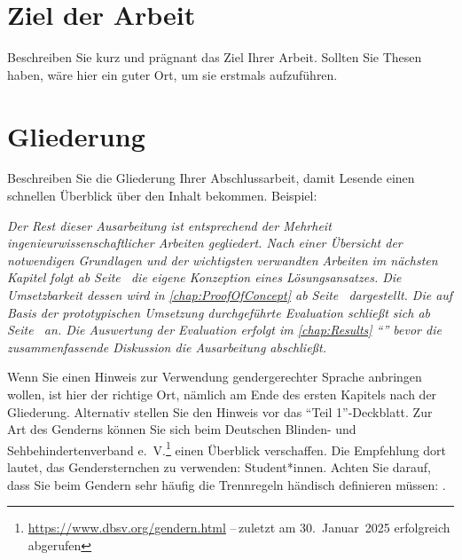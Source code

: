 \section{Ziel der Arbeit}\label{sec:Intro:Goal}
Beschreiben Sie kurz und prägnant das Ziel Ihrer Arbeit. Sollten Sie Thesen haben, wäre hier ein guter Ort, um sie erstmals aufzuführen.


\section{Gliederung}\label{sec:Intro:Structure}
Beschreiben Sie die Gliederung Ihrer Abschlussarbeit, damit Lesende einen schnellen Überblick über den Inhalt bekommen. Beispiel:

\emph{Der Rest dieser Ausarbeitung ist entsprechend der Mehrheit ingenieurwissenschaftlicher Arbeiten gegliedert. Nach einer Übersicht der notwendigen Grundlagen und der wichtigsten verwandten Arbeiten im nächsten Kapitel folgt ab Seite~\pageref{chap:Concept} die eigene Konzeption eines Lösungsansatzes. Die Umsetzbarkeit dessen wird in \autoref{chap:ProofOfConcept} ab Seite~\pageref{chap:ProofOfConcept} dargestellt. Die auf Basis der prototypischen Umsetzung durchgeführte Evaluation schließt sich ab Seite~\pageref{chap:Evaluation} an. Die Auswertung der Evaluation erfolgt im \autoref{chap:Results} \enquote{} bevor die zusammenfassende Diskussion die Ausarbeitung abschließt.}

Wenn Sie einen Hinweis zur Verwendung gendergerechter Sprache anbringen wollen, ist hier der richtige Ort, nämlich am Ende des ersten Kapitels nach der Gliederung. Alternativ stellen Sie den Hinweis vor das \enquote{Teil 1}-Deckblatt. Zur Art des Genderns können Sie sich beim Deutschen Blinden- und Sehbehindertenverband e.~V.\footnote{\url{https://www.dbsv.org/gendern.html} --\,zuletzt am 30.~Januar~2025 erfolgreich abgerufen} einen Überblick verschaffen. Die Empfehlung dort lautet, das Gendersternchen zu verwenden: Stu\-dent*\-in\-nen. Achten Sie darauf, dass Sie beim Gendern sehr häufig die Trennregeln händisch definieren müssen: .